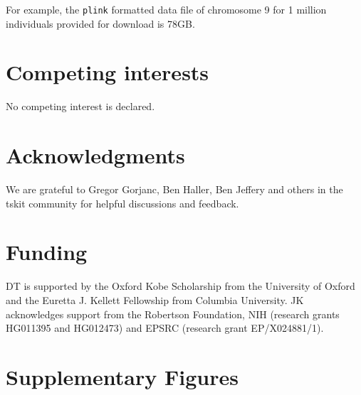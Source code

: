 \documentclass[unnumsec,webpdf,modern,large,namedate]{oup-authoring-template}%
\begin{document}
For example, the \texttt{plink} formatted data file of chromosome 9
for 1 million individuals provided for download is 78GB.



\section{Competing interests}
No competing interest is declared.

\section{Acknowledgments}
We are grateful to Gregor Gorjanc, Ben Haller, Ben Jeffery and
others in the tskit community for helpful discussions and feedback.

\section{Funding}
DT is supported by the Oxford Kobe Scholarship from the University of Oxford
and the Euretta J. Kellett Fellowship from Columbia University.
JK acknowledges support from the Robertson Foundation,
NIH (research grants HG011395 and HG012473) and
EPSRC (research grant EP/X024881/1).





\clearpage

\renewcommand\thefigure{S\arabic{figure}}
\setcounter{figure}{0}
\renewcommand\thetable{S\arabic{table}}
\setcounter{table}{0}
\section{Supplementary Figures}
\end{document}
